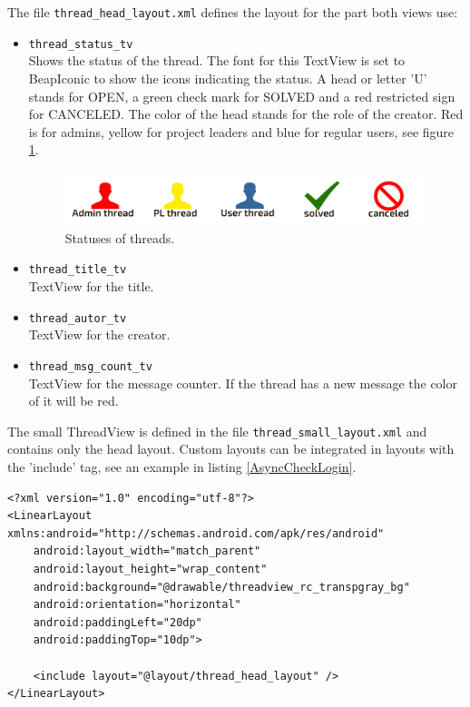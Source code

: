 \documentclass[12pt,a4paper,oneside]{report}
\newcommand{\code}[1]{\lstinline{#1}}
\begin{document}
The file \code{thread_head_layout.xml} defines the layout for the part both views use:
\begin{itemize}
\item \code{thread_status_tv}\\
Shows the status of the thread. The font for this TextView is set to BeapIconic to show the icons indicating the status. A head or letter 'U' stands for OPEN, a green check mark for SOLVED and a red restricted sign for CANCELED. The color of the head stands for the role of the creator. Red is for admins, yellow for project leaders and blue for regular users, see figure \ref{fig:ThreadStatusIcons}. 
\begin{figure}[!ht]
	\centering
    \includegraphics[width=\linewidth]{StatusIcons.png}
	\caption{Statuses of threads.}
	\label{fig:ThreadStatusIcons}
\end{figure}

\item \code{thread_title_tv}\\
TextView for the title.

\item \code{thread_autor_tv}\\
TextView for the creator.

\item \code{thread_msg_count_tv}\\
TextView for the message counter. If the thread has a new message the color of it will be red.

\end{itemize}

The small ThreadView is defined in the file \code{thread_small_layout.xml} and contains only the head layout. Custom layouts can be integrated in layouts with the 'include' tag, see an example in listing \ref{AsyncCheckLogin}.

\begin{lstlisting}[caption=Thread small layout, label=lst:ThreadSmallLayout]
<?xml version="1.0" encoding="utf-8"?>
<LinearLayout xmlns:android="http://schemas.android.com/apk/res/android"
    android:layout_width="match_parent"
    android:layout_height="wrap_content"
    android:background="@drawable/threadview_rc_transpgray_bg"
    android:orientation="horizontal"
    android:paddingLeft="20dp"
    android:paddingTop="10dp">

    <include layout="@layout/thread_head_layout" />
</LinearLayout>
\end{lstlisting}
\end{document}
